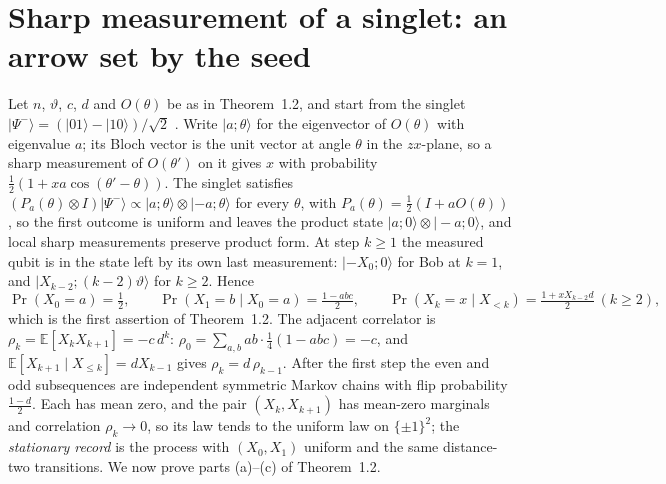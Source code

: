 \documentclass[11pt]{article}
\theoremstyle{definition}\newtheorem{definition}[theorem]{Definition}
\theoremstyle{remark}\newtheorem{remark}[theorem]{Remark}
\begin{document}
\section{Sharp measurement of a singlet: an arrow set by the seed}\label{sec:singlet}
Let $n$, $\vartheta$, $c$, $d$ and $O(\theta)$ be as in Theorem~1.2, and start from the singlet $|\Psi^-\rangle=(|01\rangle-|10\rangle)/\sqrt2$ \cite{Singh}. Write $|a;\theta\rangle$ for the eigenvector of $O(\theta)$ with eigenvalue $a$; its Bloch vector is the unit vector at angle $\theta$ in the $zx$-plane, so a sharp measurement of $O(\theta')$ on it gives $x$ with probability $\frac12(1+xa\cos(\theta'-\theta))$. The singlet satisfies $(P_a(\theta)\otimes I)|\Psi^-\rangle\propto|a;\theta\rangle\otimes|-a;\theta\rangle$ for every $\theta$, with $P_a(\theta)=\frac12(I+aO(\theta))$, so the first outcome is uniform and leaves the product state $|a;0\rangle\otimes|-a;0\rangle$, and local sharp measurements preserve product form. At step $k\ge1$ the measured qubit is in the state left by its own last measurement: $|-X_0;0\rangle$ for Bob at $k=1$, and $|X_{k-2};(k-2)\vartheta\rangle$ for $k\ge2$. Hence
\[
\Pr(X_0=a)=\tfrac12,\qquad\Pr(X_1=b\mid X_0=a)=\tfrac{1-abc}2,\qquad\Pr(X_k=x\mid X_{<k})=\tfrac{1+xX_{k-2}d}2\ (k\ge2),
\]
which is the first assertion of Theorem~1.2. The adjacent correlator is $\rho_k=\mathbb E[X_kX_{k+1}]=-c\,d^k$: $\rho_0=\sum_{a,b}ab\cdot\frac14(1-abc)=-c$, and $\mathbb E[X_{k+1}\mid X_{\le k}]=dX_{k-1}$ gives $\rho_k=d\,\rho_{k-1}$. After the first step the even and odd subsequences are independent symmetric Markov chains with flip probability $\frac{1-d}2$. Each has mean zero, and the pair $(X_k,X_{k+1})$ has mean-zero marginals and correlation $\rho_k\to0$, so its law tends to the uniform law on $\{\pm1\}^2$; the \emph{stationary record} is the process with $(X_0,X_1)$ uniform and the same distance-two transitions. We now prove parts (a)--(c) of Theorem~1.2.
\end{document}
